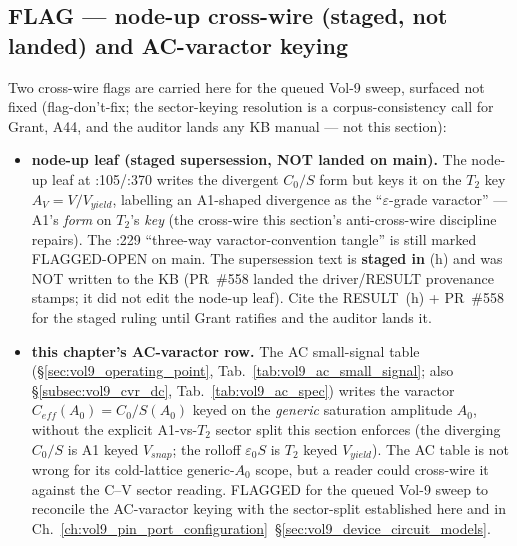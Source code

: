 \subsection{FLAG --- node-up cross-wire (staged, not landed) and AC-varactor keying}
\label{subsec:vol9_cv_node_up_flag}

Two cross-wire flags are carried here for the queued Vol-9 sweep, surfaced not
fixed (flag-don't-fix; the sector-keying resolution is a corpus-consistency call
for Grant, A44, and the auditor lands any KB manual --- not this section):

\begin{itemize}
    \item \textbf{node-up leaf (staged supersession, NOT landed on main).} The
    node-up leaf
    at :105/:370 writes the divergent $C_0/S$ form but keys it on the $T_2$ key
    $A_V = V/V_{yield}$, labelling an A1-shaped divergence as the
    ``$\varepsilon$-grade varactor'' --- A1's \emph{form} on $T_2$'s \emph{key}
    (the cross-wire this section's anti-cross-wire discipline repairs). The :229
    ``three-way varactor-convention tangle'' is still marked FLAGGED-OPEN on main.
    The supersession text is \textbf{staged in}
     (h) and was NOT
    written to the KB (PR~\#558 landed the driver/RESULT provenance stamps; it did
    not edit the node-up leaf). Cite the RESULT~(h) + PR~\#558 for the staged
    ruling until Grant ratifies and the auditor lands it.
    \item \textbf{this chapter's AC-varactor row.} The AC small-signal table
    (\S\ref{sec:vol9_operating_point}, Tab.~\ref{tab:vol9_ac_small_signal};
    also \S\ref{subsec:vol9_cvr_dc}, Tab.~\ref{tab:vol9_ac_spec}) writes the
    varactor $C_{eff}(A_0) = C_0/S(A_0)$ keyed on the \emph{generic} saturation
    amplitude $A_0$, without the explicit A1-vs-$T_2$ sector split this section
    enforces (the diverging $C_0/S$ is A1 keyed $V_{snap}$; the rolloff
    $\varepsilon_0 S$ is $T_2$ keyed $V_{yield}$). The AC table is not wrong for
    its cold-lattice generic-$A_0$ scope, but a reader could cross-wire it against
    the C--V sector reading. FLAGGED for the queued Vol-9 sweep to reconcile the
    AC-varactor keying with the sector-split established here and in
    Ch.~\ref{ch:vol9_pin_port_configuration}~\S\ref{sec:vol9_device_circuit_models}.
\end{itemize}

